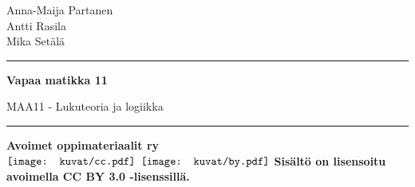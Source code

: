 
\begin{center}
    \begin{doublespace}
        \begin{LARGE}
            \textrm{Anna-Maija Partanen \\ Antti Rasila \\ Mika Setälä} \\
        \end{LARGE}
      
        \vspace{0.5cm}
        \hrule height 2pt
        \vspace{1cm}
        \begin{Huge}
            \textbf{\textrm{Vapaa matikka 11}}
        \end{Huge}

        \vspace{9cm}
      
        \begin{huge}
            \textrm{MAA11 - Lukuteoria ja logiikka}
        \end{huge}
        \vspace{1cm}
        \hrule height 2pt
    \end{doublespace}
\end{center}

\vfill

\begin{flushright}
    \textbf{Avoimet oppimateriaalit ry} \\
    $\vcenter{\hbox{\texttt{[image: kuvat/cc.pdf]}}}$
    $\vcenter{\hbox{\texttt{[image: kuvat/by.pdf]}}}$
    \textbf{Sisältö on lisensoitu avoimella CC BY 3.0 -lisenssillä.}
\end{flushright}
